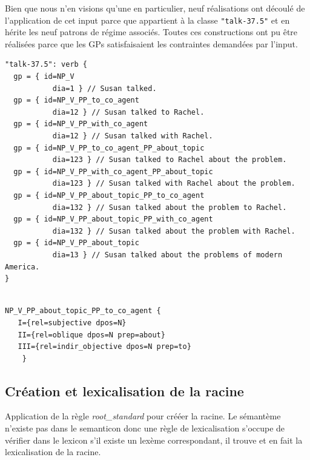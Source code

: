 Bien que nous n'en visions qu'une en particulier, neuf réalisations ont découlé de l'application de cet input parce que  appartient à la classe \texttt{"talk-37.5"} et en hérite les neuf patrons de régime associés. Toutes ces constructions ont pu être réalisées parce que les \acp{GP} satisfaisaient les contraintes demandées par l'input.

\begin{lstlisting}[language=mate, caption=Classe \texttt{talk-37.5} dans le \emph{lexicon}]
"talk-37.5": verb {
  gp = { id=NP_V
	       dia=1 } // Susan talked.
  gp = { id=NP_V_PP_to_co_agent
	       dia=12 } // Susan talked to Rachel.
  gp = { id=NP_V_PP_with_co_agent
	       dia=12 } // Susan talked with Rachel.
  gp = { id=NP_V_PP_to_co_agent_PP_about_topic
	       dia=123 } // Susan talked to Rachel about the problem.
  gp = { id=NP_V_PP_with_co_agent_PP_about_topic
	       dia=123 } // Susan talked with Rachel about the problem.
  gp = { id=NP_V_PP_about_topic_PP_to_co_agent
	       dia=132 } // Susan talked about the problem to Rachel.
  gp = { id=NP_V_PP_about_topic_PP_with_co_agent
	       dia=132 } // Susan talked about the problem with Rachel.
  gp = { id=NP_V_PP_about_topic
	       dia=13 } // Susan talked about the problems of modern America.
}
\end{lstlisting}


\begin{lstlisting}[language=XML, caption=Propriétés syntaxiques de \texttt{NP\_V\_PP\_about\_topic\_PP\_to\_co\_agent} , label=gpexemple]

NP_V_PP_about_topic_PP_to_co_agent {
   I={rel=subjective dpos=N}
   II={rel=oblique dpos=N prep=about}
   III={rel=indir_objective dpos=N prep=to}
	}
\end{lstlisting}

\subsection{Création et lexicalisation de la racine}
Application de la règle \emph{root\_standard} pour crééer la racine. Le sémantème  n'existe pas dans le semanticon donc une règle de lexicalisation  s'occupe de vérifier dans le lexicon s'il existe un lexème correspondant, il trouve  et en fait la lexicalisation de la racine.

